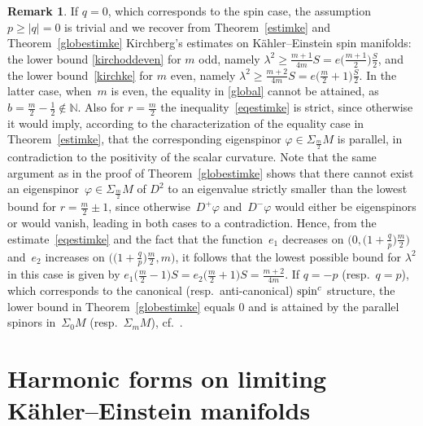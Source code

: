 \documentclass[10pt,a4paper]{amsart}
\numberwithin{equation}{section}
\theoremstyle{definition}
\newtheorem{Remark}[thm]{Remark}
\begin{document}
\begin{Remark}
If $q=0$, which corresponds to the spin case, the assumption $p \geq \vert q \vert = 0$ is trivial and we recover from Theorem~\ref{estimke} and Theorem~\ref{globestimke} Kirchberg's estimates on K\"ahler--Einstein spin manifolds: the lower bound \eqref{kirchoddeven} for $m$ odd, namely $\lambda^2\geq \frac{m+1}{4m}S=e\big(\frac{m+1}{2}\big)\frac{S}{2}$,  and the lower bound~\eqref{kirchke} for $m$ even, namely $\lambda^2\geq \frac{m+2}{4m}S=e\big(\frac{m}{2}+1\big)\frac{S}{2}$. In the latter case, when~$m$ is even, the equality in \eqref{global} cannot be attained, as $b=\frac{m}{2}-\frac{1}{2}\notin\mathbb{N}$. Also for $r=\frac{m}{2}$ the inequality~\eqref{eqestimke} is strict, since otherwise it would imply, according to the characterization of the equality case in Theorem~\ref{estimke}, that the corresponding eigenspinor $\varphi\in\Sigma_{\frac{m}{2}}M$ is parallel, in contradiction to the positivity of the scalar curvature. Note that the same argument as in the proof of Theorem~\ref{globestimke} shows that there cannot exist an eigenspinor~$\varphi\in \Sigma_{\frac{m}{2}}M$ of $D^2$ to an eigenvalue strictly smaller than the lowest bound for $r=\frac{m}{2}\pm 1$, since otherwise~$D^+\varphi$ and~$D^-\varphi$ would either be eigenspinors or would vanish, leading in both cases to a contradiction.
Hence, from the estimate~\eqref{eqestimke} and the fact that the function~$e_1$ decreases on $\big(0,\big(1+\frac{q}{p}\big)\frac{m}{2}\big)$
and~$e_2$ increases on $\big(\big(1+\frac{q}{p}\big)\frac{m}{2},m\big)$, it follows that the lowest possible bound for $\lambda^2$ in this case is given by $e_1\big(\frac{m}{2}-1\big)S=e_2\big(\frac{m}{2}+1\big)S=\frac{m+2}{4m}$. If $q=- p$ (resp.~$q = p$), which corresponds to the canonical (resp.\ anti-canonical) ${\mathop{\rm spin}^c}$ structure, the lower bound in Theorem~\ref{globestimke} equals $0$ and is attained by the parallel spinors in~$\Sigma_{0}M$ (resp.~$\Sigma_{m}M$),  cf.~\cite{Moro1}.
\end{Remark}

\section{Harmonic forms on limiting K\"ahler--Einstein manifolds}
\end{document}
